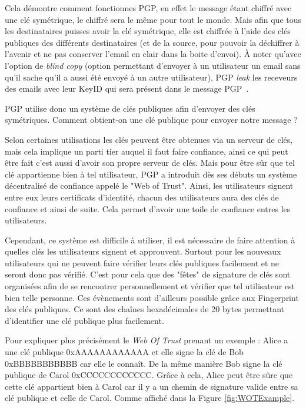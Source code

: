 Cela démontre comment fonctionnes PGP, en effet le message étant chiffré avec une clé symétrique, le chiffré sera le même pour tout le monde. Mais afin que tous les destinataires puisses avoir la clé symétrique, elle est chiffrée à l'aide des clés publiques des différents destinataires (et de la source, pour pouvoir la déchiffrer à l'avenir et ne pas conserver l'email en clair dans la boite d'envoi). À noter qu'avec l'option de \textit{blind copy} (option permettant d'envoyer à un utilisateur un email sans qu'il sache qu'il a aussi été envoyé à un autre utilisateur), PGP \textit{leak} les receveurs des emails avec leur KeyID qui sera présent dans le message PGP~\cite{BccPrivacy}.

PGP utilise donc un système de clés publiques afin d'envoyer des clés symétriques. Comment obtient-on une clé publique pour envoyer notre message ?

Selon certaines utilisations les clés peuvent être obtenues via un serveur de clés, mais cela implique un parti tier auquel il faut faire confiance, ainsi ce qui peut être fait c'est aussi d'avoir son propre serveur de clés. Mais pour être sûr que tel clé appartienne bien à tel utilisateur, PGP a introduit dès ses débuts un système décentralisé de confiance appelé le "Web of Trust". Ainsi, les utilisateurs signent entre eux leurs certificats d'identité, chacun des utilisateurs aura des clés de confiance et ainsi de suite. Cela permet d'avoir une toile de confiance entres les utilisateurs.

Cependant, ce système est difficile à utiliser, il est nécessaire de faire attention à quelles clés les utilisateurs signent et approuvent. Surtout pour les nouveaux utilisateurs qui ne peuvent faire vérifier leurs clés publiques facilement et ne seront donc pas vérifié. C'est pour cela que des "fêtes" de signature de clés sont organisées afin de se rencontrer personnellement et vérifier que tel utilisateur est bien telle personne. Ces évènements sont d'ailleurs possible grâce aux Fingerprint des clés publiques. Ce sont des chaînes hexadécimales de 20 bytes permettant d'identifier une clé publique plus facilement.

Pour expliquer plus précisément le \textit{Web Of Trust} prenant un exemple : Alice a une clé publique 0xAAAAAAAAAAAA et elle signe la clé de Bob 0xBBBBBBBBBBB car elle le connaît. De la même manière Bob signe la clé publique de Carol 0xCCCCCCCCCCCC. Grâce à cela, Alice peut être sûre que cette clé appartient bien à Carol car il y a un chemin de signature valide entre sa clé publique et celle de Carol. Comme affiché dans la Figure \ref{fig:WOTExample}.


